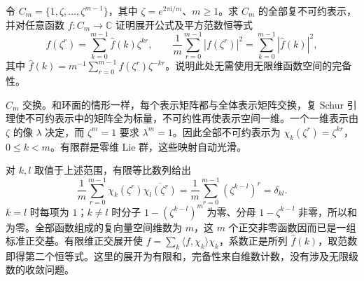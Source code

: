 \begin{exercise}\label{g1:ex:finite-cyclic-fourier}
	令 \(C_m=\{1,\zeta,\ldots,\zeta^{m-1}\}\)，其中 \(\zeta=e^{2\pi\mathrm{i}/m}\)、\(m\ge1\)。求 \(C_m\) 的全部复不可约表示，并对任意函数 \(f:C_m\to\mathbb C\) 证明展开公式及平方范数恒等式
	\[
		f(\zeta^r)=\sum_{k=0}^{m-1}\widehat f(k)\zeta^{kr},
		\qquad
		\frac1m\sum_{r=0}^{m-1}|f(\zeta^r)|^2
		=\sum_{k=0}^{m-1}|\widehat f(k)|^2,
	\]
	其中 \(\widehat f(k)=m^{-1}\sum_{r=0}^{m-1}f(\zeta^r)\zeta^{-kr}\)。说明此处无需使用无限维函数空间的完备性。
\end{exercise}
\begin{solution}
	\(C_m\) 交换。和环面的情形一样，每个表示矩阵都与全体表示矩阵交换，复 Schur 引理使不可约表示中的矩阵全为标量，不可约性再使表示空间一维。一个一维表示由 \(\zeta\) 的像 \(\lambda\) 决定，而 \(\zeta^m=1\) 要求 \(\lambda^m=1\)。因此全部不可约表示为 \(\chi_k(\zeta^r)=\zeta^{kr}\)，\(0\le k<m\)。有限群是零维 Lie 群，这些映射自动光滑。

	对 \(k,l\) 取值于上述范围，有限等比数列给出
	\[
		\frac1m\sum_{r=0}^{m-1}\chi_k(\zeta^r)\overline{\chi_l(\zeta^r)}
		=\frac1m\sum_{r=0}^{m-1}(\zeta^{k-l})^r=\delta_{kl}.
	\]
	\(k=l\) 时每项为 \(1\)；\(k\ne l\) 时分子 \(1-(\zeta^{k-l})^m\) 为零、分母 \(1-\zeta^{k-l}\) 非零，所以和为零。全部函数组成的复向量空间维数为 \(m\)，这 \(m\) 个正交非零函数因而已是一组标准正交基。有限维正交展开使 \(f=\sum_k\langle f,\chi_k\rangle\chi_k\)，系数正是所列 \(\widehat f(k)\)，取范数即得第二个恒等式。这里的展开为有限和，完备性来自维数计数，没有涉及无限级数的收敛问题。
\end{solution}

